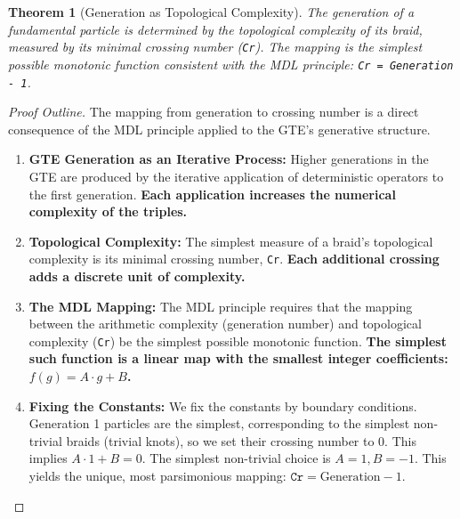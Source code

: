\documentclass[11pt]{article}
\newtheorem{theorem}{Theorem}[section]
\theoremstyle{remark}
\begin{document}
\begin{theorem}[Generation as Topological Complexity]
\label{thm:generation}
The generation of a fundamental particle is determined by the topological complexity of its braid, measured by its minimal crossing number (\texttt{Cr}). The mapping is the simplest possible monotonic function consistent with the MDL principle: \texttt{Cr = Generation - 1}.
\end{theorem}
\begin{proof}[Proof Outline]
The mapping from generation to crossing number is a direct consequence of the MDL principle applied to the GTE's generative structure.
\begin{enumerate}[leftmargin=*,itemsep=2pt]
    \item \textbf{GTE Generation as an Iterative Process:} Higher generations in the GTE are produced by the iterative application of deterministic operators to the first generation. \textbf{Each application increases the numerical complexity of the triples.}
    \item \textbf{Topological Complexity:} The simplest measure of a braid's topological complexity is its minimal crossing number, \texttt{Cr}. \textbf{Each additional crossing adds a discrete unit of complexity.}
    \item \textbf{The MDL Mapping:} The MDL principle requires that the mapping between the arithmetic complexity (generation number) and topological complexity (\texttt{Cr}) be the simplest possible monotonic function. \textbf{The simplest such function is a linear map with the smallest integer coefficients: $f(g) = A \cdot g + B$.}
    \item \textbf{Fixing the Constants:} We fix the constants by boundary conditions. Generation 1 particles are the simplest, corresponding to the simplest non-trivial braids (trivial knots), so we set their crossing number to 0. This implies $A \cdot 1 + B = 0$. The simplest non-trivial choice is $A=1, B=-1$. This yields the unique, most parsimonious mapping: $\texttt{Cr} = \text{Generation} - 1$.
\end{enumerate}
\end{proof}
\end{document}
